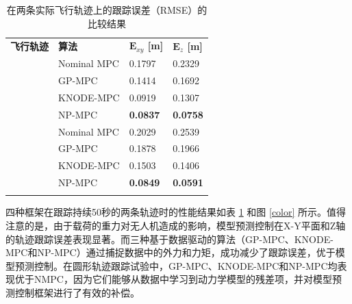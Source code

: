 \documentclass[lang=chs, degree=master, blindreview=true, winfonts=true]{yanputhesis}
\begin{document}
\renewcommand\arraystretch{1.15}
\begin{table}[htb!]
    \centering
    \caption{在两条实际飞行轨迹上的跟踪误差（RMSE）的比较结果}
    \label{table_xyz}
    \renewcommand\arraystretch{1.5} %
    \begin{tabular}{m{2.2cm}<{\centering} m{2.5cm}<{\centering} m{2.2cm}<{\centering} m{2.2cm}<{\centering}}
        \Xhline{1.pt}
        \textbf{飞行轨迹} & \textbf{算法} & \textbf{$\bm E_{xy}$ [m]} & \textbf{$\bm E_z$ [m]} \\
        \Xhline{1.pt}
        & Nominal MPC & 0.1797 & 0.2329 \\
        \multirow{2}{2.2cm}{\centering {圆}} & GP-MPC & 0.1414 & 0.1692 \\
        & KNODE-MPC & {0.0919} & {0.1307} \\
        & NP-MPC & \textbf{0.0837} & \textbf{0.0758} \\
        \hline
        & Nominal MPC & 0.2029 & 0.2539 \\
        \multirow{2}{2.2cm}{\centering {双纽线}} & GP-MPC & 0.1878 & 0.1966 \\
        & KNODE-MPC & {0.1503} & {0.1406} \\
        & NP-MPC & \textbf{0.0849} & \textbf{0.0591} \\
        \hline
        \Xhline{1.pt}
    \end{tabular}    
\end{table}

四种框架在跟踪持续50秒的两条轨迹时的性能结果如表 \ref{table_xyz} 和图 \ref{color} 所示。值得注意的是，由于载荷的重力对无人机造成的影响，模型预测控制在X-Y平面和Z轴的轨迹跟踪误差表现显著。而三种基于数据驱动的算法（GP-MPC、KNODE-MPC和NP-MPC）通过捕捉数据中的外力和力矩，成功减少了跟踪误差，优于模型预测控制。在圆形轨迹跟踪试验中，GP-MPC、KNODE-MPC和NP-MPC均表现优于NMPC，因为它们能够从数据中学习到动力学模型的残差项，并对模型预测控制框架进行了有效的补偿。
\end{document}
